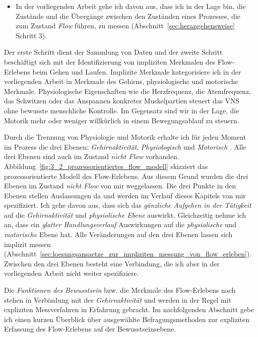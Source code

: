 \begin{itemize}

	\item In der vorliegenden Arbeit gehe ich davon aus, dass ich in der Lage bin, die Zustände und die Übergänge zwischen den Zuständen eines Prozesses, die zum Zustand \emph{Flow} führen, zu messen (Abschnitt~\ref{sec:herangehensweise} Schritt 3).

\end{itemize}

Der erste Schritt dient der Sammlung von Daten und der zweite Schritt beschäftigt sich mit der Identifizierung von impliziten Merkmalen des Flow-Erlebens beim Gehen und Laufen. Implizite Merkmale kategorisiere ich in der vorliegenden Arbeit in Merkmale des Gehirns, physiologische und motorische Merkmale. Physiologische Eigenschaften wie die Herzfrequenz, die Atemfrequenz, das Schwitzen oder das Anspannen konkreter Muskelpartien steuert das \ac{VNS} ohne bewusste menschliche Kontrolle. Im Gegensatz sind wir in der Lage, die Motorik mehr oder weniger willkürlich in einem Bewegungsablauf zu steuern. 

Durch die Trennung von Physiologie und Motorik erhalte ich für jeden Moment im Prozess die drei Ebenen: \emph{Gehirnaktivität}, \emph{Physiologisch} und \emph{Motorisch} \citep[][S.~15]{Grueter2016a}. Alle drei Ebenen sind auch im Zustand \emph{nicht Flow} vorhanden. Abbildung~\ref{fig:3_2_prozessorientiertes_flow_modell} skizziert das prozessorientierte Modell des Flow-Erlebens. Aus diesem Grund wurden die drei Ebenen im Zustand \emph{nicht Flow} von mir weggelassen. Die drei Punkte in den Ebenen stellen Auslassungen da und werden im Verlauf dieses Kapitels von mir spezifiziert. Ich gehe davon aus, dass sich das \emph{gänzliche Aufgehen in der Tätigkeit} auf die \emph{Gehirnaktivität} und \emph{physiolische Ebene} auswirkt. Gleichzeitig nehme ich an, dass ein \emph{glatter Handlungsverlauf} Auswirkungen auf die \emph{physiolische} und \emph{motorische} Ebene hat. Alle Veränderungen auf den drei Ebenen lassen sich implizit messen (Abschnitt~\ref{sec:loesungsansaetze_zur_impliziten_messung_von_flow_erleben}). Zwischen den drei Ebenen besteht eine Verbindung, die ich aber in der vorliegenden Arbeit nicht weiter spezifiziere. 

Die \emph{Funktionen des Bewusstsein} bzw. die Merkmale des Flow-Erlebens nach \citet{Henk2014} stehen in Verbindung mit der \emph{Gehirnaktivität} und werden in der Regel mit expliziten Messverfahren in Erfahrung gebracht. Im nachfolgenden Abschnitt gebe ich einen kurzen Überblick über ausgewählte Befragungsmethoden zur expliziten Erfassung des Flow-Erlebens auf der Bewusstseinsebene. 

